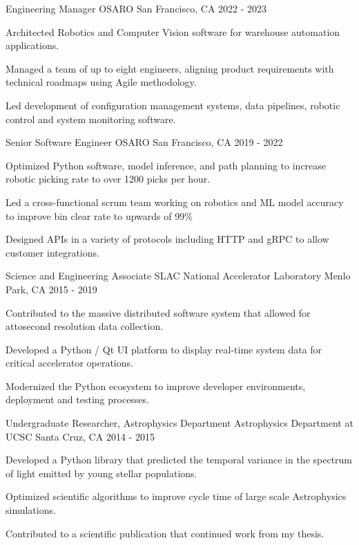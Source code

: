 \begin{cventries}
  \cventry
    {Engineering Manager}
    {OSARO}
    {San Francisco, CA}
    {2022 - 2023}
    {
      \begin{cvitems}
        \item {Architected Robotics and Computer Vision software for warehouse automation applications.}
        \item {Managed a team of up to eight engineers, aligning product requirements with technical roadmaps using Agile methodology.}
        \item {Led development of configuration management systems, data pipelines, robotic control and system monitoring software.}
      \end{cvitems}
    }
  \cventry
    {Senior Software Engineer}
    {OSARO}
    {San Francisco, CA}
    {2019 - 2022}
    {
      \begin{cvitems}
        \item {Optimized Python software, model inference, and path planning to increase robotic picking rate to over 1200 picks per hour.}
        \item {Led a cross-functional scrum team working on robotics and ML model accuracy to improve bin clear rate to upwards of 99\% }
        \item {Designed APIs in a variety of protocols including HTTP and gRPC to allow customer integrations.}
      \end{cvitems}
    }
  \cventry
    {Science and Engineering Associate}
    {SLAC National Accelerator Laboratory}
    {Menlo Park, CA}
    {2015 - 2019}
    {
      \begin{cvitems}
       \item {Contributed to the massive distributed software system that allowed for attosecond resolution data collection.}
       \item {Developed a Python / Qt UI platform to display real-time system data for critical accelerator operations.}
	     \item {Modernized the Python ecosystem to improve developer environments, deployment and testing processes.}
      \end{cvitems}
    }
  \cventry
    {Undergraduate Researcher, Astrophysics Department}
    {Astrophysics Department at UCSC}
    {Santa Cruz, CA}
    {2014 - 2015}
    {
      \begin{cvitems}
        \item {Developed a Python library that predicted the temporal variance in the spectrum of light emitted by young stellar populations.}
        \item {Optimized scientific algorithms to improve cycle time of large scale Astrophysics simulations.}
        \item {Contributed to a scientific publication that continued work from my thesis.}
      \end{cvitems}
      }
\end{cventries}